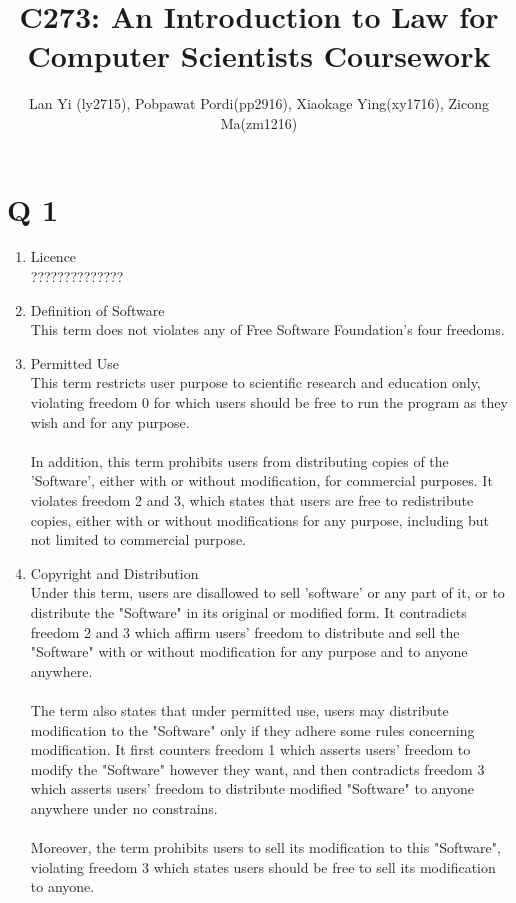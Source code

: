 \documentclass[a4paper]{article}
\title{C273: An Introduction to Law for Computer Scientists Coursework}
\author{Lan Yi (ly2715), Pobpawat Pordi(pp2916), Xiaokage Ying(xy1716), Zicong Ma(zm1216)}
\begin{document}
\maketitle
\section*{Q 1}
\begin{enumerate}
\item Licence
\\??????????????
\item Definition of Software
\\ This term does not violates any of Free Software Foundation's four freedoms.
\item Permitted Use
\\This term restricts user purpose to scientific research and education only, violating freedom 0 for which users should be free to run the program as they wish and for any purpose.
\\
\\In addition, this term prohibits users from distributing copies of the 'Software', either with or without modification, for commercial purposes. It violates freedom 2 and 3, which states that users are free to redistribute copies, either with or without modifications for any purpose, including but not limited to commercial purpose. 

\item Copyright and Distribution
\\Under this term, users are disallowed to sell 'software' or any part of it, or to distribute the "Software" in its original or modified form. It contradicts freedom 2 and 3 which affirm users' freedom to distribute and sell the "Software" with or without modification for any purpose and to anyone anywhere. 
\\
\\ The term also states that under permitted use, users may distribute modification to the "Software" only if they adhere some rules concerning modification. It first counters freedom 1 which asserts users' freedom to modify the "Software" however they want, and then contradicts freedom 3 which asserts users' freedom to distribute modified "Software" to anyone anywhere under no constrains. 
\\ 
\\ Moreover, the term prohibits users to sell its modification to this "Software", violating freedom 3 which states users should be free to sell its modification to anyone. 


\end{enumerate}
\end{document}
